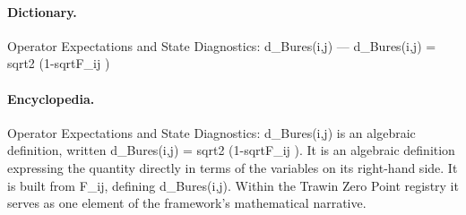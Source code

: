 \paragraph{Dictionary.}
Operator Expectations and State Diagnostics: d\_Bures(i,j) — d\_Bures(i,j) = sqrt2 (1-sqrtF\_ij )

\paragraph{Encyclopedia.}
Operator Expectations and State Diagnostics: d\_Bures(i,j) is an algebraic definition, written d\_Bures(i,j) = sqrt2 (1-sqrtF\_ij ). It is an algebraic definition expressing the quantity directly in terms of the variables on its right-hand side. It is built from F\_ij, defining d\_Bures(i,j). Within the Trawin Zero Point registry it serves as one element of the framework's mathematical narrative.
